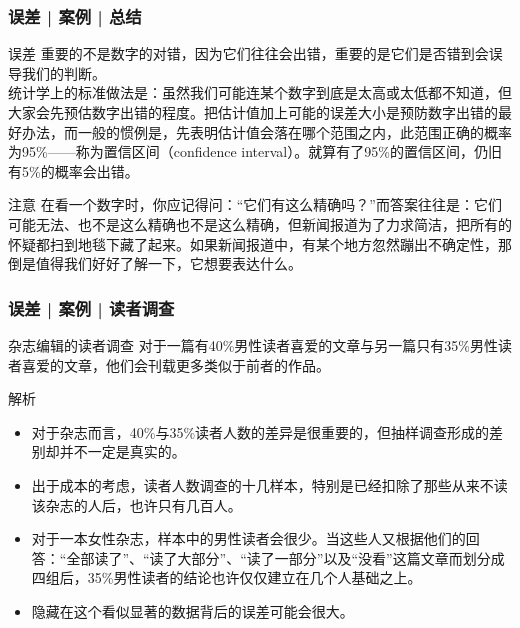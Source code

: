 \begin{frame}
  \frametitle{误差 | 案例 | 总结}
  \begin{block}{误差}
    重要的不是数字的对错，因为它们往往会出错，重要的是它们是否错到会误导我们的判断。\\
    \vspace{0.3em}
统计学上的标准做法是：虽然我们可能连某个数字到底是太高或太低都不知道，但大家会先预估数字出错的程度。把估计值加上可能的误差大小是预防数字出错的最好办法，而一般的惯例是，先表明估计值会落在哪个范围之内，此范围正确的概率为95\%——称为置信区间（confidence interval）。就算有了95\%的置信区间，仍旧有5\%的概率会出错。
  \end{block}
  \pause
  \begin{block}{注意}
在看一个数字时，你应记得问：“它们有这么精确吗？”而答案往往是：它们可能无法、也不是这么精确也不是这么精确，但新闻报道为了力求简洁，把所有的怀疑都扫到地毯下藏了起来。如果新闻报道中，有某个地方忽然蹦出不确定性，那倒是值得我们好好了解一下，它想要表达什么。
  \end{block}
\end{frame}

\begin{frame}
  \frametitle{误差 | 案例 | 读者调查}
  \begin{block}{杂志编辑的读者调查}
    对于一篇有40\%男性读者喜爱的文章与另一篇只有35\%男性读者喜爱的文章，他们会刊载更多类似于前者的作品。
  \end{block}
  \pause
  \begin{block}{解析}
    \begin{itemize}
      \item 对于杂志而言，40\%与35\%读者人数的差异是很重要的，但抽样调查形成的差别却并不一定是真实的。
      \item 出于成本的考虑，读者人数调查的十几样本，特别是已经扣除了那些从来不读该杂志的人后，也许只有几百人。
      \item 对于一本女性杂志，样本中的男性读者会很少。当这些人又根据他们的回答：“全部读了”、“读了大部分”、“读了一部分”以及“没看”这篇文章而划分成四组后，35\%男性读者的结论也许仅仅建立在几个人基础之上。
      \item 隐藏在这个看似显著的数据背后的误差可能会很大。
    \end{itemize}
  \end{block}
\end{frame}

